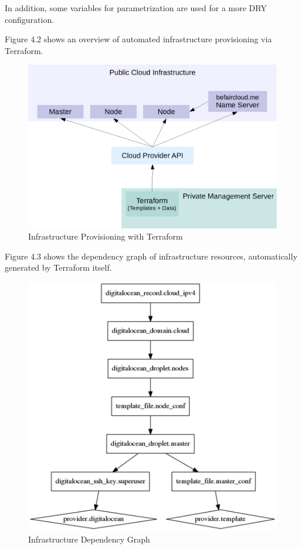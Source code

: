 In addition, some variables for parametrization are used for a more DRY configuration.

Figure 4.2 shows an overview of automated infrastructure provisioning via Terraform.

\begin{figure}[htbp]
\centering
\includegraphics{media/ch4-terraform.png}
\caption{Infrastructure Provisioning with Terraform}
\end{figure}

Figure 4.3 shows the dependency graph of infrastructure resources, automatically generated by Terraform itself.

\begin{figure}[htbp]
\centering
\includegraphics{media/ch4-graph.png}
\caption{Infrastructure Dependency Graph}
\end{figure}

